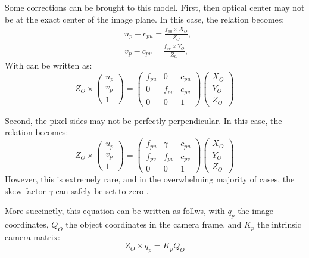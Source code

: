Some corrections can be brought to this model. First, then optical center may not be at the exact center of the image plane. In this case, the relation becomes:
\begin{equation}
  \begin{aligned}
  &u_p-c_{pu}=\frac{f_{pu}\times X_O}{Z_O},\\
  &v_p-c_{pv}=\frac{f_{pv}\times Y_O}{Z_O},
  \end{aligned}
\end{equation}
With can be written as:
\begin{equation}
  Z_O \times \begin{pmatrix}u_p\\v_p\\1\end{pmatrix} = \begin{pmatrix}f_{pu} & 0 & c_{pu} \\0 & f_{pv} & c_{pv} \\ 0&0&1\end{pmatrix}\begin{pmatrix}X_O\\Y_O\\Z_O\end{pmatrix}
\end{equation}

Second, the pixel sides may not be perfectly perpendicular. In this case, the relation becomes:
\begin{equation}
  Z_O \times \begin{pmatrix}u_p\\v_p\\1\end{pmatrix} = \begin{pmatrix}f_{pu} & \gamma & c_{pu} \\ f_{pv} & f_{pv} & c_{pv} \\ 0&0&1\end{pmatrix}\begin{pmatrix}X_O\\Y_O\\Z_O\end{pmatrix}
\end{equation}
However, this is extremely rare, and in the overwhelming majority of cases, the skew factor $\gamma$
can safely be set to zero \cite{Zhang2000}.

More succinctly, this equation can be written as follws, with $q_p$ the image coordinates, $Q_O$ the object coordinates in the camera frame, and $K_p$ the intrinsic camera matrix: 
\begin{equation}
  Z_O \times q_p = K_p Q_O
\end{equation}


